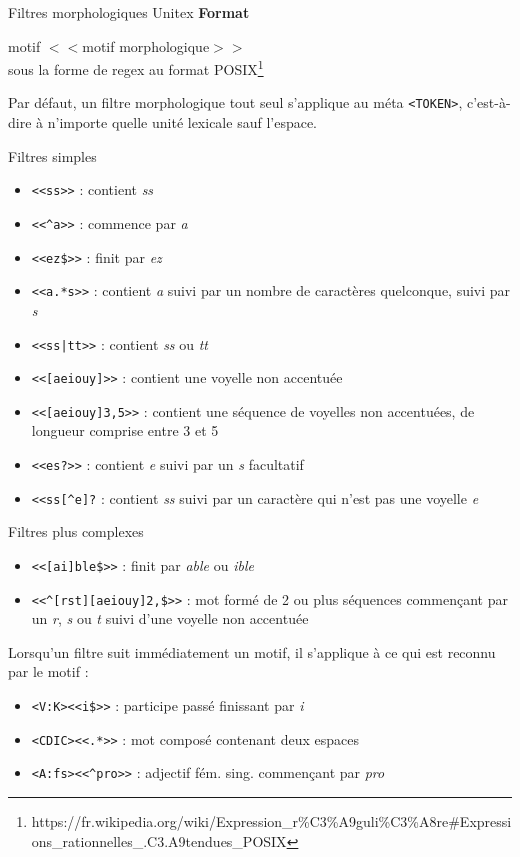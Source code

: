 \documentclass[xetex,xcolor={table,usenames,dvipsnames}]{beamer}
\newcommand{\bolder}[1]{{\color{purple}\bfseries#1}}
\begin{document}
\begin{frame}{Filtres morphologiques Unitex}
	\bolder{Format}
	
	motif $<<$motif morphologique$>>$\\
	sous la forme de regex au format \textsc{POSIX}\footnote{https://fr.wikipedia.org/wiki/Expression\_r\%C3\%A9guli\%C3\%A8re\#Expressions\_rationnelles\_.C3.A9tendues\_POSIX}
	
	Par défaut, un filtre morphologique tout seul s’applique au méta
	\texttt{<TOKEN>}, c’est-à-dire à n’importe quelle unité lexicale sauf l’espace.
\end{frame}

\begin{frame}{Filtres simples}
	\begin{itemize}
		\item \texttt{<<ss>>} : contient \textit{ss}
		\item \texttt{<<\^{}a>>} : commence par \textit{a}
		\item \texttt{<<ez\${}>>} : finit par \textit{ez}
		\item \texttt{<<a.*s>>} : contient \textit{a} suivi par un nombre de caractères quelconque, suivi par \textit{s}
		\item \texttt{<<ss|tt>>} : contient \textit{ss} ou \textit{tt}
		\item \texttt{<<[aeiouy]>>} : contient une voyelle non accentuée
		\item \texttt{<<[aeiouy]3,5>>} : contient une séquence de voyelles non accentuées, de longueur comprise entre 3 et 5
		\item \texttt{<<es?>>} : contient \textit{e} suivi par un \textit{s} facultatif
		\item \texttt{<<ss[\^{}e]?} : contient \textit{ss} suivi par un caractère qui n'est pas une voyelle \textit{e}
	\end{itemize}
\end{frame}

\begin{frame}{Filtres plus complexes}
	\begin{itemize}
		\item \texttt{<<[ai]ble\${}>>} : finit par \textit{able} ou \textit{ible}
		\item \texttt{<<\^{}[rst][aeiouy]{2,}\${}>>} : mot formé de 2 ou plus séquences commençant par un \textit{r}, \textit{s} ou \textit{t} suivi d'une voyelle non accentuée
	\end{itemize}
	
	Lorsqu'un filtre suit immédiatement un motif, il s'applique à ce qui est reconnu par le motif :
	\begin{itemize}
		\item \texttt{<V:K><<i\${}>>} : participe passé finissant par \textit{i}
		\item \texttt{<CDIC><<.*>>} : mot composé contenant deux espaces
		\item \texttt{<A:fs><<\^{}pro>>} : adjectif fém. sing. commençant par \textit{pro}
	\end{itemize}
\end{frame}
\end{document}
